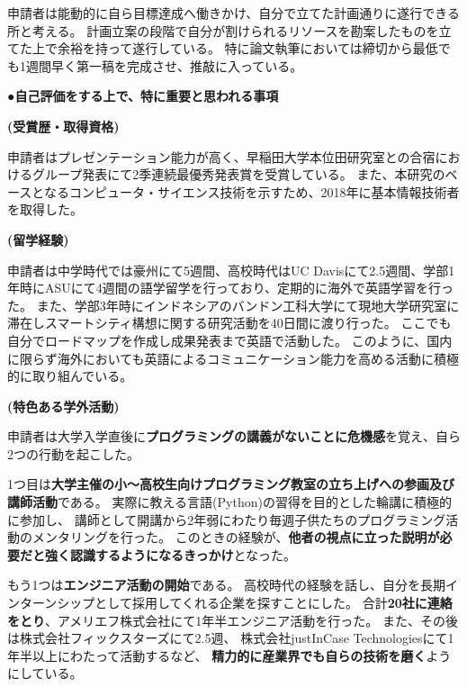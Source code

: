 {申請者は能動的に自ら目標達成へ働きかけ、自分で立てた計画通りに遂行できる所と考える。
計画立案の段階で自分が割けられるリソースを勘案したものを立てた上で余裕を持って遂行している。
特に論文執筆においては締切から最低でも1週間早く第一稿を完成させ、推敲に入っている。

\noindent
●\textbf{自己評価をする上で、特に重要と思われる事項}

\textbf{(受賞歴・取得資格)}

申請者はプレゼンテーション能力が高く、早稲田大学本位田研究室との合宿におけるグループ発表にて2季連続最優秀発表賞を受賞している。
また、本研究のベースとなるコンピュータ・サイエンス技術を示すため、2018年に基本情報技術者を取得した。

\textbf{(留学経験)}

申請者は中学時代では豪州にて5週間、高校時代はUC Davisにて2.5週間、学部1年時にASUにて4週間の語学留学を行っており、定期的に海外で英語学習を行った。
また、学部3年時にインドネシアのバンドン工科大学にて現地大学研究室に滞在しスマートシティ構想に関する研究活動を40日間に渡り行った。
ここでも自分でロードマップを作成し成果発表まで英語で活動した。
このように、国内に限らず海外においても英語によるコミュニケーション能力を高める活動に積極的に取り組んでいる。

\textbf{(特色ある学外活動)}

申請者は大学入学直後に\textbf{プログラミングの講義がないことに危機感}を覚え、自ら2つの行動を起こした。

1つ目は\textbf{大学主催の小〜高校生向けプログラミング教室の立ち上げへの参画及び講師活動}である。
実際に教える言語(Python)の習得を目的とした輪講に積極的に参加し、
講師として開講から2年弱にわたり毎週子供たちのプログラミング活動のメンタリングを行った。
このときの経験が、\textbf{他者の視点に立った説明が必要だと強く認識するようになるきっかけ}となった。

もう1つは\textbf{エンジニア活動の開始}である。
高校時代の経験を話し、自分を長期インターンシップとして採用してくれる企業を探すことにした。
合計\textbf{20社に連絡をとり}、アメリエフ株式会社にて1年半エンジニア活動を行った。
また、その後は株式会社フィックスターズにて2.5週、
株式会社justInCase Technologiesにて1年半以上にわたって活動するなど、
\textbf{精力的に産業界でも自らの技術を磨く}ようにしている。

}

